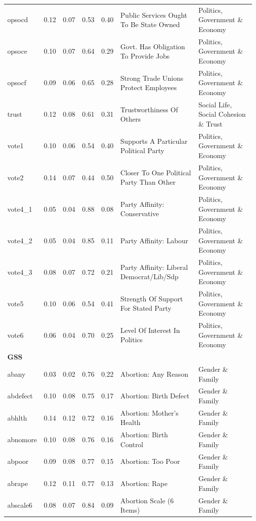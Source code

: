\documentclass[
  12pt,
]{article}
\begin{document}
\begin{landscape}
\begin{scriptsize}
\begin{longtable}{|p{1.75in}|p{0.3in}|p{0.3in}|p{0.3in}|p{0.3in}|p{2.5in}|p{2.5in}}
opsocd & 0.12 & 0.07 & 0.53 & 0.40 & Public Services Ought To Be State Owned & Politics, Government \& Economy \\ 
opsoce & 0.10 & 0.07 & 0.64 & 0.29 & Govt. Has Obligation To Provide Jobs & Politics, Government \& Economy \\ 
opsocf & 0.09 & 0.06 & 0.65 & 0.28 & Strong Trade Unions Protect Employees & Politics, Government \& Economy \\ 
trust & 0.12 & 0.08 & 0.61 & 0.31 & Trustworthiness Of Others & Social Life, Social Cohesion \& Trust \\ 
vote1 & 0.10 & 0.06 & 0.54 & 0.40 & Supports A Particular Political Party & Politics, Government \& Economy \\ 
vote2 & 0.14 & 0.07 & 0.44 & 0.50 & Closer To One Political Party Than Other & Politics, Government \& Economy \\ 
vote4\_1 & 0.05 & 0.04 & 0.88 & 0.08 & Party Affinity: Conservative & Politics, Government \& Economy \\ 
vote4\_2 & 0.05 & 0.04 & 0.85 & 0.11 & Party Affinity: Labour & Politics, Government \& Economy \\ 
vote4\_3 & 0.08 & 0.07 & 0.72 & 0.21 & Party Affinity: Liberal Democrat/Lib/Sdp & Politics, Government \& Economy \\ 
vote5 & 0.10 & 0.06 & 0.54 & 0.41 & Strength Of Support For Stated Party & Politics, Government \& Economy \\ 
vote6 & 0.06 & 0.04 & 0.70 & 0.25 & Level Of Interest In Politics & Politics, Government \& Economy \\ 
\midrule
\multicolumn{7}{l}{\textbf{GSS}} \\ 
\midrule
abany & 0.03 & 0.02 & 0.76 & 0.22 & Abortion: Any Reason & Gender \& Family \\ 
abdefect & 0.10 & 0.08 & 0.75 & 0.17 & Abortion: Birth Defect & Gender \& Family \\ 
abhlth & 0.14 & 0.12 & 0.72 & 0.16 & Abortion: Mother's Health & Gender \& Family \\ 
abnomore & 0.10 & 0.08 & 0.76 & 0.16 & Abortion: Birth Control & Gender \& Family \\ 
abpoor & 0.09 & 0.08 & 0.77 & 0.15 & Abortion: Too Poor & Gender \& Family \\ 
abrape & 0.12 & 0.11 & 0.77 & 0.13 & Abortion: Rape & Gender \& Family \\ 
abscale6 & 0.08 & 0.07 & 0.84 & 0.09 & Abortion Scale (6 Items) & Gender \& Family \\ 

\end{longtable}
\end{scriptsize}
\end{landscape}
\end{document}
